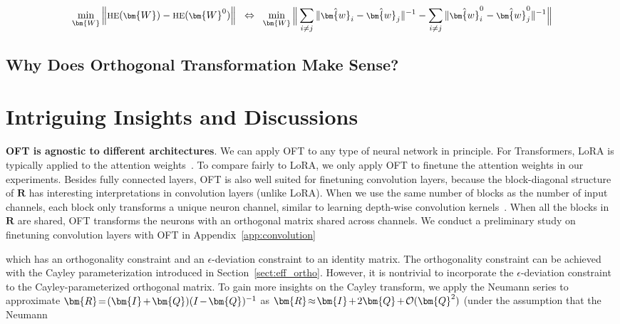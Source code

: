 \begin{itemize}[leftmargin=*,nosep]

\begin{equation}\label{eq:oft_principle}
\footnotesize
\min_{\bm{W}} \left\| \text{HE}(\bm{W})-\text{HE}(\bm{W}^0)\right\|~~\Leftrightarrow~~\min_{\bm{W}} \bigg{\|} \sum_{i\neq j} \|\hat{\bm{w}}_i-\hat{\bm{w}}_j\|^{-1}-\sum_{i\neq j} \|\hat{\bm{w}}^0_i-\hat{\bm{w}}^0_j\|^{-1}\bigg{\|}
\end{equation}

\subsection{Why Does Orthogonal Transformation Make Sense?}

\section{Intriguing Insights and Discussions}

\textbf{OFT is agnostic to different architectures}. We can apply OFT to any type of neural network in principle. For Transformers, LoRA is typically applied to the attention weights~\cite{hulora2022}. To compare fairly to LoRA, we only apply OFT to finetune the attention weights in our experiments. Besides fully connected layers, OFT is also well suited for finetuning convolution layers, because the block-diagonal structure of $\bm{R}$ has interesting interpretations in convolution layers (unlike LoRA). When we use the same number of blocks as the number of input channels, each block only transforms a unique neuron channel, similar to learning depth-wise convolution kernels~\cite{chollet2017xception}. When all the blocks in $\bm{R}$ are shared, OFT transforms the neurons with an orthogonal matrix shared across channels. We conduct a preliminary study on finetuning convolution layers with OFT in Appendix~\ref{app:convolution}

which has an orthogonality constraint and an $\epsilon$-deviation constraint to an identity matrix. The orthogonality constraint can be achieved with the Cayley parameterization introduced in Section~\ref{sect:eff_ortho}. However, it is nontrivial to incorporate the $\epsilon$-deviation constraint to the Cayley-parameterized orthogonal matrix. To gain more insights on the Cayley transform, we apply the Neumann series to approximate $\thickmuskip=2mu \medmuskip=2mu \bm{R}=(\bm{I}+\bm{Q})(I-\bm{Q})^{-1}$ as $\thickmuskip=2mu \medmuskip=2mu \bm{R}\approx\bm{I}+2\bm{Q}+\mathcal{O}(\bm{Q}^2)$ (under the assumption that the Neumann  {\parfillskip=0pt\par}


\end{itemize}
